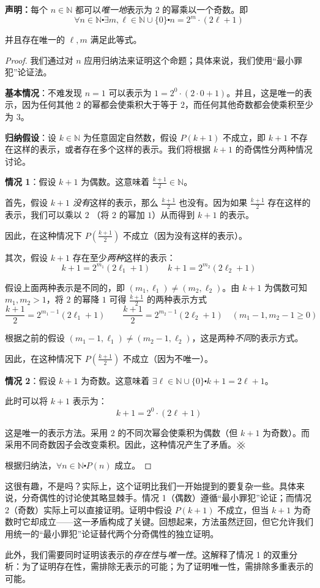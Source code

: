 \begin{example}[将自然数唯一地表示为乘积]
    
    \textbf{声明：}每个 $n \in \mathbb{N}$ 都可以\emph{唯一地}表示为 $2$ 的幂乘以一个奇数。即
    \[\forall n \in \mathbb{N} \centerdot \exists m, \ell \in \mathbb{N} \cup \{0\} \centerdot n = 2^m \cdot (2\ell + 1)\]

    并且存在唯一的 $\ell, m$ 满足此等式。

    \begin{proof}
        我们通过对 $n$ 应用归纳法来证明这个命题；具体来说，我们使用``最小罪犯''论证法。

        \textbf{基本情况}：不难发现 $n = 1$ 可以表示为 $1 = 2^0 \cdot (2 \cdot 0 + 1)$。并且，这是唯一的表示，因为任何其他 $2$ 的幂都会使乘积大于等于 $2$，而任何其他奇数都会使乘积至少为 $3$。

        \textbf{归纳假设}：设 $k \in \mathbb{N}$ 为任意固定自然数，假设 $P(k+1)$ 不成立，即 $k+1$ 不存在这样的表示，或者存在多个这样的表示。我们将根据 $k+1$ 的奇偶性分两种情况讨论。

        \textbf{情况 1}：假设 $k+1$ 为偶数。这意味着 $\frac{k+1}{2} \in \mathbb{N}$。

        首先，假设 $k+1$ \emph{没有}这样的表示，那么 $\frac{k+1}{2}$ 也没有。因为如果 $\frac{k+1}{2}$ 存在这样的表示，我们可以乘以 $2$ （将 $2$ 的幂加 $1$）从而得到 $k+1$ 的表示。

        因此，在这种情况下 $P(\frac{k+1}{2})$ 不成立（因为没有这样的表示）。

        其次，假设 $k+1$ 存在至少\emph{两种}这样的表示：
        \[k + 1 = 2^{m_1}(2\ell_1 + 1) \qquad k + 1 = 2^{m_2}(2\ell_2 + 1)\]

        假设上面两种表示是不同的，即 $(m_1, \ell_1) \ne (m_2, \ell_2)$。由 $k+1$ 为偶数可知 $m_1, m_2 > 1$，将 $2$ 的幂降 $1$ 可得 $\frac{k+1}{2}$ 的两种表示方式
        \[\frac{k+1}{2}=2^{m_1-1}(2\ell_1+1) \qquad \frac{k+1}{2}=2^{m_2-1}(2\ell_2+1) \quad (m_1-1, m_2-1 \ge 0)\]

        根据之前的假设 $(m_1-1, \ell_1) \ne (m_2-1, \ell_2)$，这是两种\emph{不同}的表示方式。

        因此，在这种情况下 $P(\frac{k+1}{2})$ 不成立（因为不唯一）。

        \textbf{情况 2}：假设 $k+1$ 为奇数。这意味着 $\exists \ell \in \mathbb{N} \cup \{0\} \centerdot k+1 = 2\ell + 1$。
        
        此时可以将 $k+1$ 表示为：
        \[k+1 = 2^0 \cdot (2\ell + 1)\]

        这是唯一的表示方法。采用 $2$ 的不同次幂会使乘积为偶数（但 $k+1$ 为奇数）。而采用不同奇数因子会改变乘积。因此，这种情况产生了矛盾。$\hashx$

        根据归纳法，$\forall n \in \mathbb{N} \centerdot P(n)$ 成立。
    \end{proof}
\end{example}

这很有趣，不是吗？实际上，这个证明比我们一开始提到的要复杂一些。具体来说，分奇偶性的讨论使其略显棘手。情况 1（偶数）遵循``最小罪犯''论证；而情况 2（奇数）实际上可以直接证明。证明中假设 $P(k+1)$ 不成立，但当 $k+1$ 为奇数时它却成立——这一矛盾构成了关键。回想起来，方法虽然迂回，但它允许我们用统一的``最小罪犯''论证替代两个分奇偶性的独立证明。

此外，我们需要同时证明该表示的\emph{存在性}与\emph{唯一性}。这解释了情况 1 的双重分析：为了证明存在性，需排除无表示的可能；为了证明唯一性，需排除多重表示的可能。
